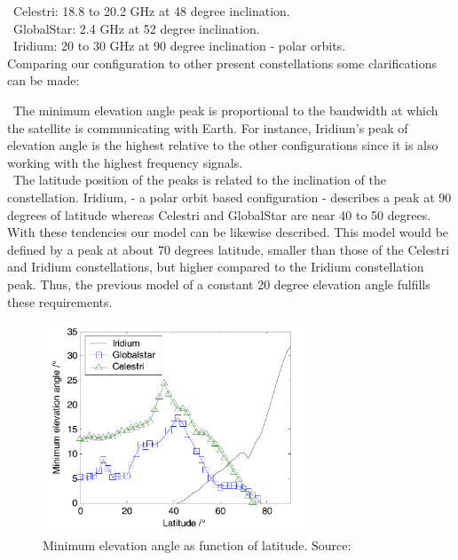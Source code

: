 \textendash\ Celestri: 18.8 to 20.2 GHz at 48 degree inclination.\\
\textendash\ GlobalStar: 2.4 GHz at 52 degree inclination.\\
\textendash\ Iridium: 20 to 30 GHz at 90 degree inclination - polar orbits.\\

Comparing our configuration to other present constellations some clarifications can be made: 

\textendash\ The minimum elevation angle peak is proportional to the bandwidth at which the satellite is communicating with Earth. For instance, Iridium's peak of elevation angle is the highest relative to the other configurations since it is also working with the highest frequency signals. \\

\textendash\ The latitude position of the peaks is related to the inclination of the constellation. Iridium, - a polar orbit based configuration - describes a peak at 90 degrees of latitude whereas Celestri and GlobalStar are near 40 to 50 degrees. \\

With these tendencies our model can be likewise described. This model would be defined by a peak at about 70 degrees latitude, smaller than those of the Celestri and Iridium constellations, but higher compared to the Iridium constellation peak. Thus, the previous model of a constant 20 degree elevation angle fulfills these requirements. 


\begin{figure}[h]
\includegraphics[width=8cm]{latitudes}
\centering
\caption{Minimum elevation angle as function of latitude. Source: \cite{Li2016}}
\end{figure}
